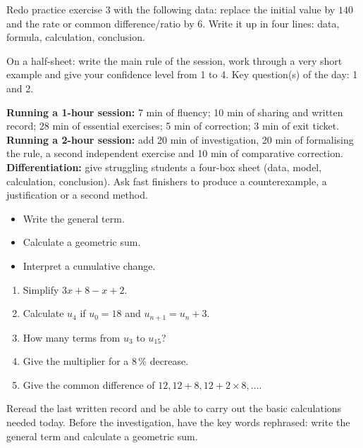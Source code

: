 
    \begin{dm}Redo practice exercise 3 with the following data: replace the initial value by $140$ and the rate or common difference/ratio by $6$. Write it up in four lines: data, formula, calculation, conclusion.\end{dm}

    \begin{sortie}On a half-sheet: write the main rule of the session, work through a very short example and give your confidence level from 1 to 4. Key question(s) of the day: 1 and 2.\end{sortie}

    \ifprof
    \begin{methode}
    \textbf{Running a 1-hour session:} 7 min of fluency; 10 min of sharing and written record; 28 min of essential exercises; 5 min of correction; 3 min of exit ticket.\\
    \textbf{Running a 2-hour session:} add 20 min of investigation, 20 min of formalising the rule, a second independent exercise and 10 min of comparative correction.\\
    \textbf{Differentiation:} give struggling students a four-box sheet (data, model, calculation, conclusion). Ask fast finishers to produce a counterexample, a justification or a second method.
    \end{methode}
    \fi
{}
\begin{objectifs}\begin{itemize}\item Write the general term.\item Calculate a geometric sum.\item Interpret a cumulative change.\end{itemize}\end{objectifs}
\begin{automatismes}\begin{enumerate}\item Simplify $3x+8-x+2$. \item Calculate $u_4$ if $u_0=18$ and $u_{n+1}=u_n+3$. \item How many terms from $u_3$ to $u_{15}$? \item Give the multiplier for a $8\,\%$ decrease. \item Give the common difference of $12,12+8,12+2\times8,\ldots$. \end{enumerate}\end{automatismes}
\begin{prerequis}Reread the last written record and be able to carry out the basic calculations needed today. Before the investigation, have the key words rephrased: write the general term and calculate a geometric sum.\end{prerequis}

